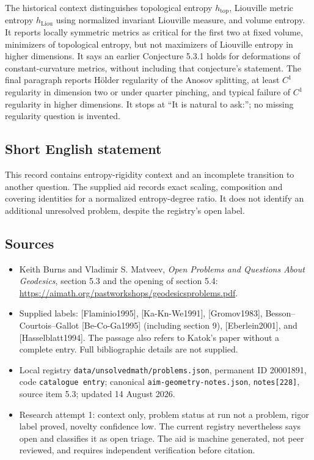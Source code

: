 \documentclass[11pt]{article}
\begin{document}
The historical context distinguishes topological entropy \(h_{\mathrm{top}}\), Liouville metric entropy \(h_{\mathrm{Liou}}\) using normalized invariant Liouville measure, and volume entropy. It reports locally symmetric metrics as critical for the first two at fixed volume, minimizers of topological entropy, but not maximizers of Liouville entropy in higher dimensions. It says an earlier Conjecture 5.3.1 holds for deformations of constant-curvature metrics, without including that conjecture's statement. The final paragraph reports H\"older regularity of the Anosov splitting, at least \(C^1\) regularity in dimension two or under quarter pinching, and typical failure of \(C^1\) regularity in higher dimensions. It stops at ``It is natural to ask:''; no missing regularity question is invented.
\subsection{Short English statement}
This record contains entropy-rigidity context and an incomplete transition to another question. The supplied aid records exact scaling, composition and covering identities for a normalized entropy-degree ratio. It does not identify an additional unresolved problem, despite the registry's open label.
\subsection{Sources}
\begin{itemize}
\item Keith Burns and Vladimir S. Matveev, \emph{Open Problems and Questions About Geodesics}, section 5.3 and the opening of section 5.4: \url{https://aimath.org/pastworkshops/geodesicsproblems.pdf}.
\item Supplied labels: [Flaminio1995], [Ka-Kn-We1991], [Gromov1983], Besson--Courtois--Gallot [Be-Co-Ga1995] (including section 9), [Eberlein2001], and [Hasselblatt1994]. The passage also refers to Katok's paper without a complete entry. Full bibliographic details are not supplied.
\item Local registry \texttt{data/unsolvedmath/problems.json}, permanent ID 20001891, code \texttt{catalogue entry}; canonical \texttt{aim-geometry-notes.json}, \texttt{notes[228]}, source item 5.3; updated 14 August 2026.
\item Research attempt 1: context only, problem status at run not a problem, rigor label proved, novelty confidence low. The current registry nevertheless says open and classifies it as open triage. The aid is machine generated, not peer reviewed, and requires independent verification before citation.
\end{itemize}
\end{document}
